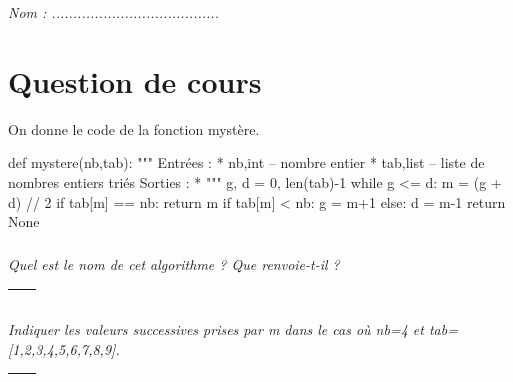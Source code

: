 \documentclass[10pt]{article}
\newif\ifprof
\begin{document}


\ifprof
\begin{center}
\large{\textit{Éléments de corrigé}}
\end{center}
\else
\begin{flushright}
\large{\textsl{Nom : .......................................}}
\end{flushright}

\vspace{1cm}
\fi


\section*{Question de cours}
\ifprof
\else
On donne le code de la fonction mystère.

\begin{py}
\begin{python}
def mystere(nb,tab):
    """ 
    Entrées : 
        * nb,int -- nombre entier
        * tab,list -- liste de nombres entiers triés
    Sorties : 
        * 
    """
    g, d = 0, len(tab)-1
    while g <= d:
        m = (g + d) // 2
        if tab[m] == nb:
            return m
        if tab[m] < nb:
            g = m+1
        else:
            d = m-1
    return None
\end{python}
\end{py}
\fi

\subparagraph{}
\textit{Quel est le nom de cet algorithme ? Que renvoie-t-il ?}
\ifprof
\begin{corrige}
Il s'agit de l'algorithme de recherche d'un nombre par dichotomie dans une liste triée. 
Il renvoie l'index du nombre recherché si le nombre existe dans la liste. Il renvoie \textsf{None} si le nombre est absent.
\end{corrige}
\else

\begin{tabular}{|p{}|}
\hline
$$\quad$$
\vspace{1cm}
$$\quad$$ \\
\hline
\end{tabular}
\fi

\subparagraph{}
\textit{Indiquer les valeurs successives prises par \textsf{m} dans le cas où \textsf{nb=4} et 
\textsf{tab=[1,2,3,4,5,6,7,8,9]}.}
\ifprof
\begin{corrige}
4, 1, 2, 3
\end{corrige}
\else

\begin{tabular}{|p{}|}
\hline
$$\quad$$
$$\quad$$ \\
\hline
\end{tabular}
\fi
\end{document}
